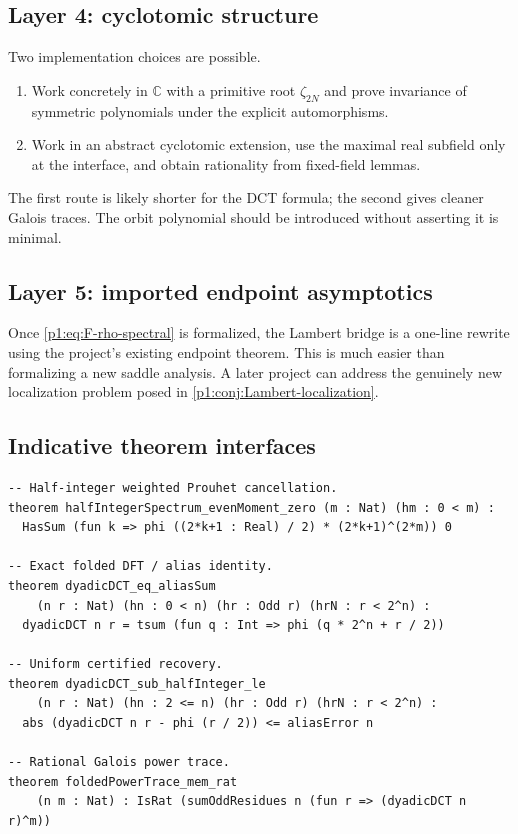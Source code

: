 \documentclass[11pt,oneside]{article}
\theoremstyle{definition}
\theoremstyle{remark}
\newcommand{\C}{\mathbb C}
\begin{document}
\subsection{Layer 4: cyclotomic structure}

Two implementation choices are possible.
\begin{enumerate}
 \item Work concretely in $\C$ with a primitive root $\zeta_{2N}$ and prove
 invariance of symmetric polynomials under the explicit automorphisms.
 \item Work in an abstract cyclotomic extension, use the maximal real subfield
 only at the interface, and obtain rationality from fixed-field lemmas.
\end{enumerate}
The first route is likely shorter for the DCT formula; the second gives cleaner
Galois traces.  The orbit polynomial should be introduced without asserting it
is minimal.

\subsection{Layer 5: imported endpoint asymptotics}

Once \eqref{p1:eq:F-rho-spectral} is formalized, the Lambert bridge is a one-line
rewrite using the project's existing endpoint theorem.  This is much easier than
formalizing a new saddle analysis.  A later project can address the genuinely
new localization problem posed in \cref{p1:conj:Lambert-localization}.

\subsection{Indicative theorem interfaces}

\begin{lstlisting}[style=pseudo,caption={Schematic Lean theorem signatures.}]
-- Half-integer weighted Prouhet cancellation.
theorem halfIntegerSpectrum_evenMoment_zero (m : Nat) (hm : 0 < m) :
  HasSum (fun k => phi ((2*k+1 : Real) / 2) * (2*k+1)^(2*m)) 0

-- Exact folded DFT / alias identity.
theorem dyadicDCT_eq_aliasSum
    (n r : Nat) (hn : 0 < n) (hr : Odd r) (hrN : r < 2^n) :
  dyadicDCT n r = tsum (fun q : Int => phi (q * 2^n + r / 2))

-- Uniform certified recovery.
theorem dyadicDCT_sub_halfInteger_le
    (n r : Nat) (hn : 2 <= n) (hr : Odd r) (hrN : r < 2^n) :
  abs (dyadicDCT n r - phi (r / 2)) <= aliasError n

-- Rational Galois power trace.
theorem foldedPowerTrace_mem_rat
    (n m : Nat) : IsRat (sumOddResidues n (fun r => (dyadicDCT n r)^m))
\end{lstlisting}
\end{document}
